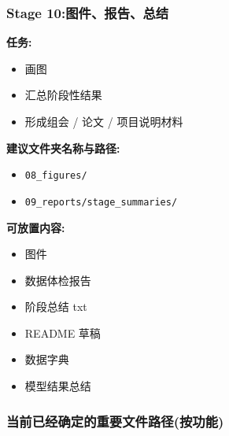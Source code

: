 \documentclass[lang=cn,scheme=chinese,color=blue,device=normal,toc=onecol,math=cm]{elegantbook}
\begin{document}
\subsubsection{Stage 10:图件、报告、总结}


\textbf{任务:}\par


\begin{itemize}
\item 画图
\item 汇总阶段性结果
\item 形成组会 /\allowbreak{} 论文 /\allowbreak{} 项目说明材料
\end{itemize}


\textbf{建议文件夹名称与路径:}\par


\begin{itemize}
\item \texttt{08\_\allowbreak{}figures/\allowbreak{}}
\item \texttt{09\_\allowbreak{}reports/\allowbreak{}stage\_\allowbreak{}summaries/\allowbreak{}}
\end{itemize}


\textbf{可放置内容:}\par


\begin{itemize}
\item 图件
\item 数据体检报告
\item 阶段总结 txt
\item README 草稿
\item 数据字典
\item 模型结果总结
\end{itemize}


\subsubsection{当前已经确定的重要文件路径(按功能)}
\end{document}
